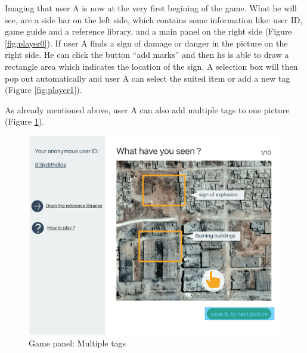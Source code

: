 Imaging that user A is now at the very first begining of the game.
What he will see,
are a side bar on the left side,
which contains some information like:
user ID,
game guide and a reference library,
and a main panel on the right side (Figure \ref{fig:player0}).
If user A finds a sign of damage or danger in the picture on the right side.
He can click the button ``add marks'' and then hs is able to draw a rectangle area which indicates the location of the sign.
A selection box will then pop out automatically and user A can select the suited item or add a new tag (Figure \ref{fig:player1}).

As already mentioned above,
user A can also add multiple tags to one picture (Figure \ref{fig:player2}).

\noindent\begin{minipage}{.45\textwidth}
\begin{figure}[H]
\centering
\includegraphics[width=\textwidth]{figures/function-player-2}
\caption{Game panel: Multiple tags \cite{satellite-photo-1}}
\label{fig:player2}
\end{figure}
\end{minipage}\hfill
